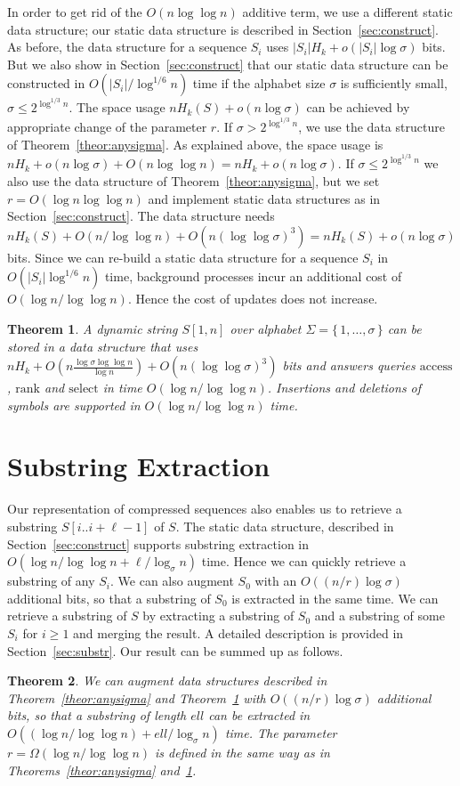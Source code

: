 \documentclass[11pt]{article}\usepackage{fullpage}
\def\idrm#1{\ensuremath{\mathrm{#1}}}
\newtheorem{theorem}{Theorem}
\newcommand{\ra}{\idrm{rank}}
\newcommand{\sel}{\idrm{select}}
\newcommand{\acc}{\idrm{access}}
\begin{document}
In order to get rid of the $O(n\log\log n)$ additive term, we use a different static data structure;  our static data structure is described in Section~\ref{sec:construct}. As before, the data structure for a sequence $S_i$ uses  $|S_i|H_k + o(|S_i|\log\sigma)$ bits.   But we also show in Section~\ref{sec:construct} that our static data structure can be constructed in $O(|S_i|/\log^{1/6}n )$ time if the alphabet size $\sigma$ is sufficiently small, $\sigma\le 2^{\log^{1/3}n}$.   The space usage $nH_k(S)+o(n\log\sigma)$ can be achieved by appropriate change of the parameter $r$.  
If $\sigma> 2^{\log^{1/3}n}$, we use the data structure of Theorem~\ref{theor:anysigma}.  As explained above, the space usage is $nH_k+o(n\log\sigma)+O(n\log\log n)=nH_k+o(n\log\sigma)$.
If $\sigma\le 2^{\log^{1/3}n}$ we  also use the data structure of Theorem~\ref{theor:anysigma}, but we set $r=O(\log n \log\log n)$ and implement static data structures as in  Section~\ref{sec:construct}. The data structure needs 
$nH_k(S)+O(n/\log\log n)+O(n(\log\log \sigma)^3)=nH_k(S)+o(n\log\sigma)$ bits. Since we can re-build a static data structure for a sequence $S_i$ in $O(|S_i|\log^{1/6}n)$ time, background processes incur an additional cost of $O(\log n/\log\log n)$. Hence the cost of updates does not increase.
 \begin{theorem}
  \label{theor:anysigma2}
A dynamic string $S[1,n]$  over alphabet $\Sigma=\{\,1,\ldots,\sigma\,\}$ 
can be stored in a data structure that uses $nH_k + O(n\frac{\log\sigma\log\log n}{\log n})+ O(n(\log\log \sigma)^3)$ bits and answers queries $\acc$, $\ra$ and $\sel$ in time $O(\log n/\log \log n)$.
Insertions and deletions of symbols are supported in $O(\log n /\log \log n)$ time. 
\end{theorem}

\section{Substring Extraction}
\label{sec:substr0}
Our representation of compressed sequences also enables us to retrieve a substring $S[i..i+\ell-1]$ of $S$.
The static data structure, described in Section~\ref{sec:construct} supports substring extraction in $O(\log n/\log\log n +\ell/\log_{\sigma} n)$ time. Hence we can quickly retrieve a substring of any $S_i$. We can also augment $S_0$ with an $O((n/r)\log \sigma)$ additional bits, so that a substring of $S_0$ is extracted in the same time.
We can retrieve a substring of $S$ by extracting a substring of $S_0$ and a substring of some $S_i$ for $i\ge 1$ and merging the result. A detailed description is provided in Section~\ref{sec:substr}.  Our  result can be summed up as follows.
\begin{theorem}
  \label{theor:substr}
We can augment  data structures described in Theorem~\ref{theor:anysigma} and Theorem~\ref{theor:anysigma2} with 
$O((n/r) \log\sigma)$ additional bits, so that a substring of length $ell$ can be extracted in $O((\log n/\log\log n)+ell/\log_{\sigma}n)$ time. The parameter $r=\Omega(\log n/\log\log n)$ is defined in the same way as in Theorems~\ref{theor:anysigma} and~\ref{theor:anysigma2}. 
\end{theorem}
\end{document}
